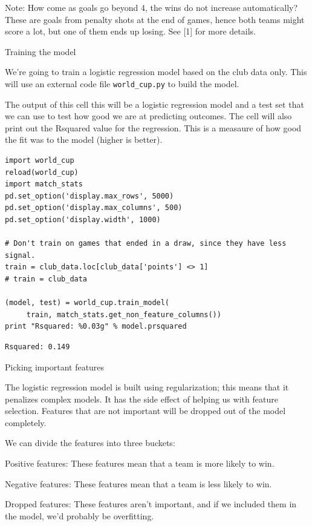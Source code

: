 \documentclass[12pt,fleqn]{article}\usepackage{../common}
\begin{document}
Note: How come as goals go beyond 4, the wins do not increase
automatically? These are goals from penalty shots at the end of games,
hence both teams might score a lot, but one of them ends up losing. See [1]
for more details.

Training the model

We're going to train a logistic regression model based on the club data
only. This will use an external code file \verb!world_cup.py! to build the
model.

The output of this cell this will be a logistic regression model and a test
set that we can use to test how good we are at predicting outcomes. The
cell will also print out the Rsquared value for the regression. This is a
measaure of how good the fit was to the model (higher is better).

\begin{verbatim}
import world_cup
reload(world_cup)
import match_stats
pd.set_option('display.max_rows', 5000)
pd.set_option('display.max_columns', 500)
pd.set_option('display.width', 1000)

# Don't train on games that ended in a draw, since they have less signal.
train = club_data.loc[club_data['points'] <> 1] 
# train = club_data

(model, test) = world_cup.train_model(
     train, match_stats.get_non_feature_columns())
print "Rsquared: %0.03g" % model.prsquared
\end{verbatim}

\begin{verbatim}
Rsquared: 0.149
\end{verbatim}

Picking important features

The logistic regression model is built using regularization; this means
that it penalizes complex models. It has the side effect of helping us with
feature selection. Features that are not important will be dropped out of
the model completely.

We can divide the features into three buckets:

Positive features: These features mean that a team is more likely to win.

Negative features: These features mean that a team is less likely to win. 

Dropped features: These features aren't important, and if we included them
in the model, we'd probably be overfitting. 
\end{document}
